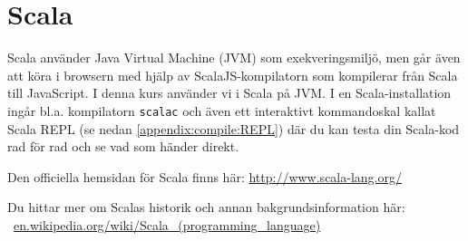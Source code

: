 %
%
%


\section{Scala}

Scala använder Java Virtual Machine (JVM) som exekveringsmiljö, men går även att köra i browsern med hjälp av ScalaJS-kompilatorn som kompilerar från Scala till JavaScript. I denna kurs använder vi i Scala på JVM.
I en Scala-installation ingår bl.a. kompilatorn \texttt{scalac} och även ett interaktivt kommandoskal kallat Scala REPL (se nedan \ref{appendix:compile:REPL}) där du kan testa din Scala-kod rad för rad och se vad som händer direkt.


Den officiella hemsidan för Scala finns här: \url{http://www.scala-lang.org/}

Du hittar mer om Scalas historik och annan bakgrundsinformation här:\\\mbox{%
 \href{https://en.wikipedia.org/wiki/Scala_(programming_language)}{en.wikipedia.org/wiki/Scala\_(programming\_language)}
}

